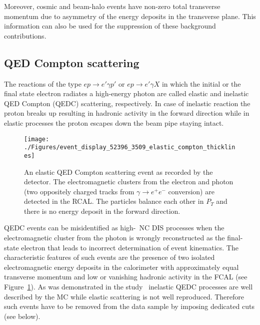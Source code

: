Moreover, cosmic and beam-halo events have non-zero total transverse momentum due to asymmetry of the energy deposits in the transverse plane. This information can also be used for the suppression of these background contributions. 

\subsection{QED Compton scattering}
The reactions of the type $ep \rightarrow e' \gamma p'$ or $ep \rightarrow e'\gamma X$ in which the initial or the final state electron radiates a high-energy photon are called elastic and inelastic QED Compton (QEDC) scattering, respectively. In case of inelastic reaction the proton breaks up resulting in hadronic activity in the forward direction while in elastic processes the proton escapes down the beam pipe staying intact. 
\begin{figure}[htbp]
	\centering
	\texttt{[image: ./Figures/event\_display\_52396\_3509\_elastic\_compton\_thicklines]} 
	\caption{An elastic QED Compton scattering event as recorded by the \zeus detector. The electromagnetic clusters from the electron and photon (two oppositely charged tracks from $\gamma \rightarrow e^+e^-$ conversion) are detected in the RCAL. The particles balance each other in $P_T$ and there is no energy deposit in the forward direction.}
	\label{fig:qedceventdisplay}
\end{figure}

QEDC events can be misidentified as high-\qsq~NC DIS processes when the electromagnetic cluster from the photon is wrongly reconstructed as the final-state electron that leads to incorrect determination of event kinematics. The characteristic features of such events are the presence of two isolated electromagnetic energy deposits in the calorimeter with approximately equal transverse momentum and low or vanishing hadronic activity in the FCAL (see Figure~\ref{fig:qedceventdisplay}). As was demonstrated in the study~\cite{thesis:moritz:2001} inelastic QEDC processes are well described by the \djangoh MC while elastic scattering is not well reproduced. Therefore such events have to be removed from the data sample by imposing dedicated cuts (see below).

